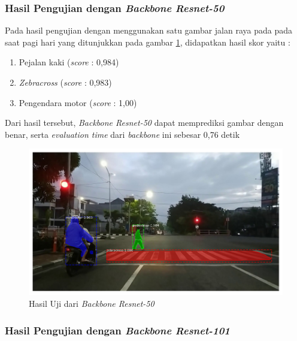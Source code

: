 \subsubsection{Hasil Pengujian dengan \textit{Backbone Resnet-50}}

Pada hasil pengujian dengan menggunakan satu gambar jalan raya pada pada saat pagi hari yang ditunjukkan pada gambar \ref{fig:hasil-resnet50}, didapatkan hasil skor yaitu :
\begin{enumerate}[nolistsep]
	\item Pejalan kaki (\textit{score} : 0,984)
	\item \textit{Zebracross} (\textit{score} : 0,983)
	\item Pengendara motor (\textit{score} : 1,00)
\end{enumerate}
Dari hasil tersebut, \textit{Backbone Resnet-50} dapat memprediksi gambar dengan benar, serta \textit{evaluation time} dari \textit{backbone} ini sebesar 0,76 detik
\begin{figure}[h] 
	\centering
	\includegraphics[scale=0.3]{gambar/fajar-frame800-resnet50.png}
	\caption{Hasil Uji dari \textit{Backbone Resnet-50}}
	\label{fig:hasil-resnet50}
\end{figure}

\subsubsection{Hasil Pengujian dengan \textit{Backbone Resnet-101}}

